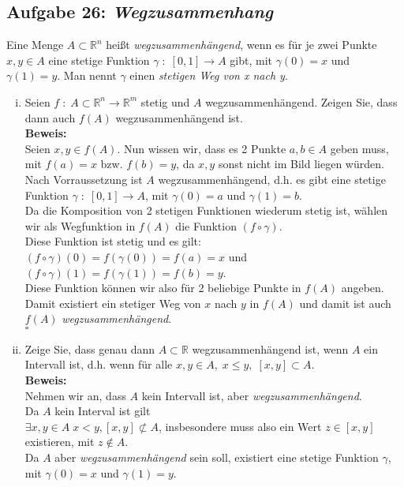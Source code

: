 \subsection*{Aufgabe 26: \mdseries\itshape Wegzusammenhang}
Eine Menge $A \subset \mathbb{R}^n$ heißt \emph{wegzusammenhängend}, wenn es für je zwei Punkte
$x,y \in A$ eine stetige Funktion $\gamma \; : \; [0,1] \rightarrow A$ gibt, mit $\gamma (0) = x$
und $\gamma (1) = y$. Man nennt $\gamma$ einen \emph{stetigen Weg von x nach y}.
\begin{enumerate}[(i)]
    \item Seien $f \; : \; A \subset \mathbb{R}^n \rightarrow \mathbb{R}^m$ stetig und $A$ 
        wegzusammenhängend. Zeigen Sie, dass dann auch $f(A)$ wegzusammenhängend ist.\\
    \textbf{Beweis:}\\
        Seien $x,y \in f(A)$. Nun wissen wir, dass es 2 Punkte $a,b \in A$ geben muss, mit $f(a) = x$ bzw. $f(b) = y$, da 
	$x,y$ sonst nicht im Bild liegen würden.\\

	Nach Vorraussetzung ist $A$ wegzusammenhängend, d.h. es gibt eine stetige Funktion $\gamma \; : \; [0,1] \rightarrow A$, mit
	$\gamma (0) = a$ und $\gamma (1) = b$.\\

	Da die Komposition  von 2 stetigen Funktionen wiederum stetig ist, wählen wir als Wegfunktion in $f(A)$ die Funktion $(f \circ \gamma )$.\\
	Diese Funktion ist stetig und es gilt:\\
	$(f \circ \gamma ) (0) = f( \gamma (0) ) = f(a) = x$ und\\
	$(f \circ \gamma ) (1) = f(\gamma (1) ) = f(b) = y$.\\

	Diese Funktion können wir also für 2 beliebige Punkte in $f(A)$ angeben. Damit existiert ein stetiger Weg von $x$ nach $y$ in $f(A)$ und
	damit ist auch $f(A)$ \emph{wegzusammenhängend}.\\

	\mbox{} \hfill $\square$

    \item Zeige Sie, dass genau dann $A \subset \mathbb{R}$ wegzusammenhängend ist, wenn $A$ 
        ein Intervall ist, d.h. wenn für alle $x,y \in A, \; x\leq y, \;[x,y] \subset A$.\\
    \textbf{Beweis:}\\
        Nehmen wir an, dass $A$ kein Intervall ist, aber \emph{wegzusammenhängend}.\\
	Da $A$ kein Interval ist gilt\\
		$\exists x,y \in A \; x < y , [x,y] \not\subset A$, insbesondere muss also ein Wert $z \in [x,y]$ existieren,
		mit $z \not\in A$.\\
		Da $A$ aber \emph{wegzusammenhängend} sein soll, existiert eine stetige Funktion $\gamma$, mit
		$\gamma (0) = x$ und $\gamma (1) = y$.\\


\end{enumerate}

